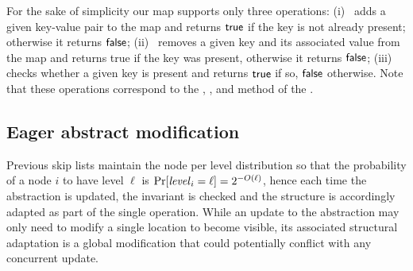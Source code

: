 For the sake of simplicity our map supports only three operations: (i)~ adds a given key-value pair to the map and 
returns $\lit{true}$ if the key is not already present; otherwise it returns $\lit{false}$; 
(ii)~ removes a given key and its associated value from the map and returns true if the 
key was present, otherwise it returns $\lit{false}$; (iii)~ checks whether a given key
is present and returns $\lit{true}$ if so, $\lit{false}$ otherwise. Note that these operations
correspond to the , , and  method of the  .


\subsection{Eager abstract modification}

Previous skip lists maintain the node per level distribution so that the probability of a node $i$ to 
have level $\ell$ is 
$\Pr[\ms{level}_i=\ell] = 2^{-O(\ell)}$, hence each time the abstraction is 
updated, the invariant is checked and the structure is accordingly 
adapted as part of the single operation.
While an update to the abstraction may only need to modify a single location to become visible, 
its associated structural adaptation is a global modification that could potentially conflict with any concurrent update.

